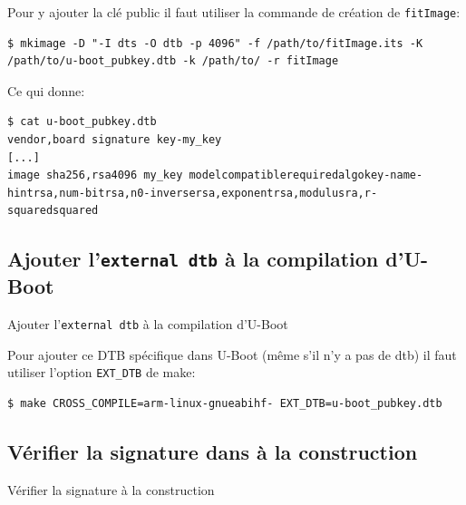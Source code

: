 \documentclass[aspectratio=169]{beamer}
\begin{document}
\begin{frame}[fragile]
Pour y ajouter la clé public il faut utiliser la commande de création de \texttt{fitImage}:
\begin{lstlisting}[style=shell]
$ mkimage -D "-I dts -O dtb -p 4096" -f /path/to/fitImage.its -K /path/to/u-boot_pubkey.dtb -k /path/to/ -r fitImage
\end{lstlisting}
Ce qui donne:
\begin{lstlisting}[style=shell]
$ cat u-boot_pubkey.dtb
vendor,board signature key-my_key
[...]
image sha256,rsa4096 my_key modelcompatiblerequiredalgokey-name-hintrsa,num-bitrsa,n0-inversersa,exponentrsa,modulusra,r-squaredsquared
\end{lstlisting}     
\end{frame}


\subsection{Ajouter l'\texttt{external dtb} à la compilation d'U-Boot}

\begin{frame}
\begin{center}
\large{Ajouter l'\texttt{external dtb} à la compilation d'U-Boot}
\end{center}
\end{frame}

\begin{frame}[fragile]
Pour ajouter ce DTB spécifique dans U-Boot (même s'il n'y a pas de dtb) il faut utiliser l'option \texttt{EXT\_DTB} de make:
\begin{lstlisting}[style=shell]
$ make CROSS_COMPILE=arm-linux-gnueabihf- EXT_DTB=u-boot_pubkey.dtb
\end{lstlisting}
\end{frame}


\subsection{Vérifier la signature dans à la construction}

\begin{frame}
\begin{center}
\large{Vérifier la signature à la construction}
\end{center}
\end{frame}
\end{document}
